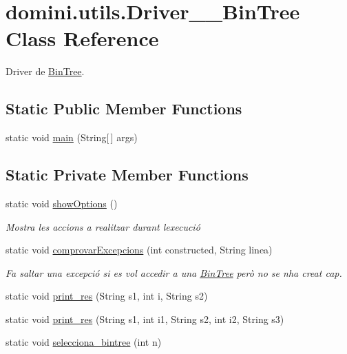 \hypertarget{classdomini_1_1utils_1_1Driver____BinTree}{}\section{domini.\+utils.\+Driver\+\_\+\+\_\+\+Bin\+Tree Class Reference}
\label{classdomini_1_1utils_1_1Driver____BinTree}


Driver de \hyperlink{classdomini_1_1utils_1_1BinTree}{Bin\+Tree}.  


\subsection*{Static Public Member Functions}
\begin{DoxyCompactItemize}
\item 
static void \hyperlink{classdomini_1_1utils_1_1Driver____BinTree_a08875cef02b7a770a105b0b6b976a681}{main} (String\mbox{[}$\,$\mbox{]} args)
\end{DoxyCompactItemize}
\subsection*{Static Private Member Functions}
\begin{DoxyCompactItemize}
\item 
static void \hyperlink{classdomini_1_1utils_1_1Driver____BinTree_aadd7535430d353033b6f35b6d466e018}{show\+Options} ()
\begin{DoxyCompactList}\small\item\em Mostra les accions a realitzar durant l\textquotesingle{}execució \end{DoxyCompactList}\item 
static void \hyperlink{classdomini_1_1utils_1_1Driver____BinTree_a06b6edeb965f3677c7ebb085d512f568}{comprovar\+Excepcions} (int constructed, String linea)
\begin{DoxyCompactList}\small\item\em Fa saltar una excepció si es vol accedir a una \hyperlink{classdomini_1_1utils_1_1BinTree}{Bin\+Tree} però no se n\textquotesingle{}ha creat cap. \end{DoxyCompactList}\item 
static void \hyperlink{classdomini_1_1utils_1_1Driver____BinTree_a434e26afb3eb701558d81b0fd1c29dcb}{print\+\_\+res} (String s1, int i, String s2)
\item 
static void \hyperlink{classdomini_1_1utils_1_1Driver____BinTree_a2d59fc46084a11fab2c22ce35c693f60}{print\+\_\+res} (String s1, int i1, String s2, int i2, String s3)
\item 
static void \hyperlink{classdomini_1_1utils_1_1Driver____BinTree_a0d90bf2cb928174547e712140b5a4fe5}{selecciona\+\_\+bintree} (int n)
\end{DoxyCompactItemize}


